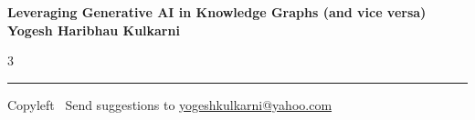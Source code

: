 \documentclass[8pt,landscape]{article}
\begin{document}
\footnotesize


\begin{center}
\Large{\textbf{Leveraging Generative AI in Knowledge Graphs (and vice versa)\\ Yogesh Haribhau Kulkarni}}
\end{center}

\begin{multicols}{3}

\end{multicols}

\rule{\linewidth}{0.25pt}
\scriptsize
Copyleft \textcopyleft\  Send suggestions to
\href{http://www.yogeshkulkarni.com}{yogeshkulkarni@yahoo.com}
\end{document}
